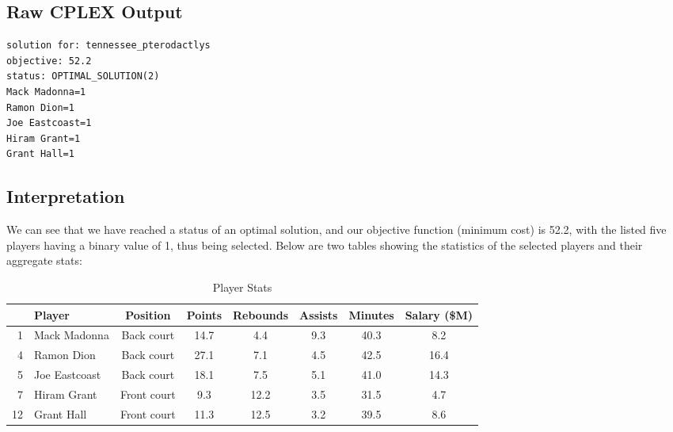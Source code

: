 \documentclass[a4paper,11pt]{article}
\begin{document}
\subsection{Raw CPLEX Output}
\begin{verbatim}
solution for: tennessee_pterodactlys
objective: 52.2
status: OPTIMAL_SOLUTION(2)
Mack Madonna=1
Ramon Dion=1
Joe Eastcoast=1
Hiram Grant=1
Grant Hall=1
\end{verbatim}

\subsection{Interpretation}
We can see that we have reached a status of an optimal solution, and our objective function (minimum cost) is 52.2, with the listed five players having a binary value of 1, thus being selected. Below are two tables showing the statistics of the selected players and their aggregate stats:

\begin{table}[h!]
    \centering
    \renewcommand{\arraystretch}{1.2} %
    \begin{tabular}{rlcccccc}
        \hline
        & \textbf{Player} & \textbf{Position} & \textbf{Points} & \textbf{Rebounds} & \textbf{Assists} & \textbf{Minutes} & \textbf{Salary (\$M)} \\
        \hline
        1 & Mack Madonna    & Back court        & 14.7            & 4.4               & 9.3              & 40.3             & 8.2                   \\
        4 & Ramon Dion      & Back court        & 27.1            & 7.1               & 4.5              & 42.5             & 16.4                  \\
        5 & Joe Eastcoast   & Back court        & 18.1            & 7.5               & 5.1              & 41.0             & 14.3                  \\
        7 & Hiram Grant     & Front court       & 9.3             & 12.2              & 3.5              & 31.5             & 4.7                   \\
        12 & Grant Hall     & Front court       & 11.3            & 12.5              & 3.2              & 39.5             & 8.6                   \\
        \hline
    \end{tabular}
    \caption{Player Stats}
    \label{tab:selected_players}
\end{table}
\end{document}
